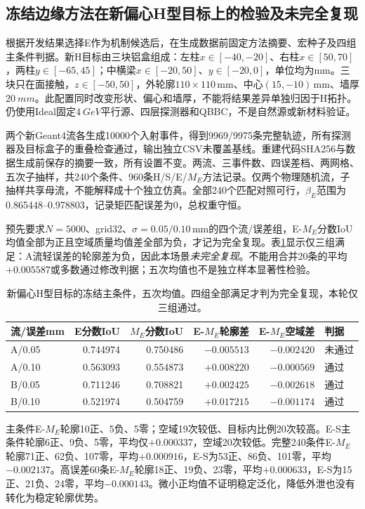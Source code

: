 \documentclass[UTF8,fontset=none,zihao=-4,a4paper]{ctexart}
\begin{document}
\subsection{冻结边缘方法在新偏心H型目标上的检验及未完全复现}
根据开发结果选择E作为机制候选后，在生成数据前固定方法摘要、宏种子及四组主条件判据。新H目标由三块铝盒组成：左柱$x\in[-40,-20]$、右柱$x\in[50,70]$，两柱$y\in[-65,45]$；中横梁$x\in[-20,50]$、$y\in[-20,0]$，单位均为mm。三块只在面接触，$z\in[-50,50]$，外轮廓$110\times110\,\mathrm{mm}$、中心$(15,-10)\,\mathrm{mm}$、墙厚$\SI{20}{mm}$。此配置同时改变形状、偏心和墙厚，不能将结果差异单独归因于H拓扑。仍使用Ideal固定$\SI{4}{GeV}$平行源、四层探测器和QBBC，不是自然源或新材料验证。

两个新Geant4流各生成10000个入射事件，得到9969/9975条完整轨迹，所有探测器及目标盒子的重叠检查通过，输出独立CSV未覆盖基线。重建代码SHA256与数据生成前保存的摘要一致，所有设置不变。两流、三事件数、四误差档、两网格、五次子抽样，共240个条件、960条H/S/E/$M_E$方法记录。仅两个物理随机流，子抽样共享母流，不能解释成十个独立仿真。全部240个匹配对照可行，$\beta_E$范围为0.865448--0.978803，记录矩匹配误差为0，总权重守恒。

预先要求$N=5000$、grid32、$\sigma=0.05/0.10\,\mathrm{mm}$的四个流/误差组，E-$M_E$分数IoU均值全部为正且空域质量均值差全部为负，才记为完全复现。表\ref{tab:edge-h-heldout}显示仅三组满足：A流轻误差的轮廓差为负，因此本场景\emph{未完全复现}。不能用合并20条的平均$+0.005587$或多数通过修改判据；五次均值也不是独立样本显著性检验。

\begin{table}[H]
\centering
\caption{新偏心H型目标的冻结主条件，五次均值。四组全部满足才判为完全复现，本轮仅三组通过。}
\label{tab:edge-h-heldout}
\small
\begin{tabular}{lrrrrl}
\toprule
流/误差mm & E分数IoU & $M_E$分数IoU & E-$M_E$轮廓差 & E-$M_E$空域差 & 判据\\
\midrule
A/0.05 & 0.744974 & 0.750486 & $-0.005513$ & $-0.002420$ & 未通过\\
A/0.10 & 0.563093 & 0.554873 & $+0.008220$ & $-0.000569$ & 通过\\
B/0.05 & 0.711246 & 0.708821 & $+0.002425$ & $-0.002618$ & 通过\\
B/0.10 & 0.521974 & 0.504759 & $+0.017215$ & $-0.001174$ & 通过\\
\bottomrule
\end{tabular}
\end{table}

主条件E-$M_E$轮廓10正、5负、5零；空域19次较低、目标内比例20次较高。E-S主条件轮廓6正、9负、5零，平均仅$+0.000337$，空域20次较低。完整240条件E-$M_E$轮廓71正、62负、107零，平均$+0.000916$，E-S为53正、86负、101零，平均$-0.002137$。高误差60条E-$M_E$轮廓18正、19负、23零，平均$+0.000633$，E-S为15正、21负、24零，平均$-0.000143$。微小正均值不证明稳定泛化，降低外泄也没有转化为稳定轮廓优势。
\end{document}

